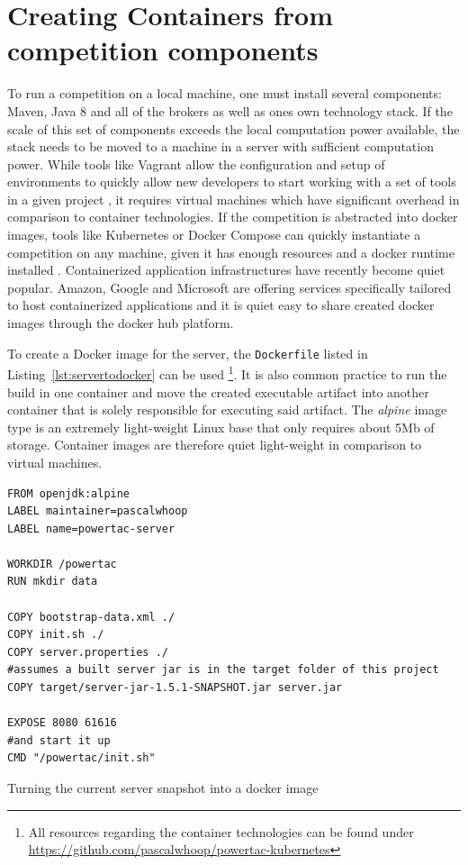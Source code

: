 \section{Creating Containers from competition components}
\label{sec:creating_containers_from_competition_components}

To run a competition on a local machine, one must install several components: Maven, Java 8 and all of the brokers as
well as ones own technology stack. If the scale of this set of components exceeds the local computation power available,
the stack needs to be moved to a machine in a server with sufficient computation power. While tools like Vagrant allow
the configuration and setup of environments to quickly allow new developers to start working with a set of tools in a
given project \citep{vagrant} , it requires virtual machines which have significant overhead in comparison to container
technologies. If the competition is abstracted into docker images, tools like Kubernetes or Docker Compose can quickly
instantiate a competition on any machine, given it has enough resources and a docker runtime installed \citep{docker}.
Containerized application infrastructures have recently become quiet popular. Amazon, Google and Microsoft are offering
services specifically tailored to host containerized applications and it is quiet easy to share created docker images
through the docker hub platform.

To create a Docker image for the server, the \texttt{Dockerfile} listed in Listing~\ref{lst:servertodocker} can be used
\footnote{All resources regarding the container technologies can be found under
\url{https://github.com/pascalwhoop/powertac-kubernetes}}.
It is also common practice to run the build in one container and move the created executable artifact into another
container that is solely responsible for executing said artifact. The \emph{alpine} image type is an extremely
light-weight Linux base that only requires about 5Mb of storage. Container images are therefore quiet light-weight in comparison
to virtual machines.

\begin{listing}[h]

    \begin{verbatim}
FROM openjdk:alpine
LABEL maintainer=pascalwhoop
LABEL name=powertac-server

WORKDIR /powertac
RUN mkdir data

COPY bootstrap-data.xml ./
COPY init.sh ./
COPY server.properties ./
#assumes a built server jar is in the target folder of this project
COPY target/server-jar-1.5.1-SNAPSHOT.jar server.jar

EXPOSE 8080 61616
#and start it up
CMD "/powertac/init.sh"
    \end{verbatim}
    \caption{Turning the current server snapshot into a docker image}
    \label{lst:servertodocker}
\end{listing}

